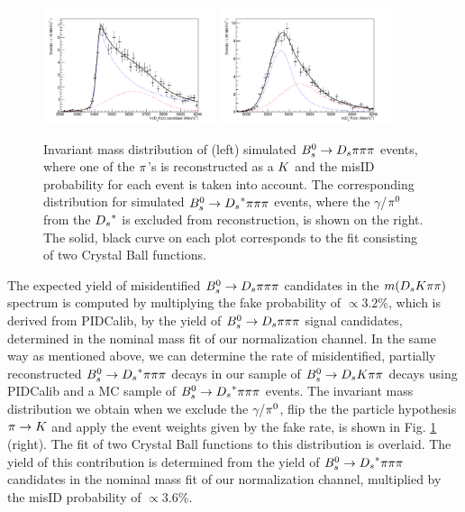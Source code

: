 \begin{figure}[h]
\includegraphics[height=6.cm,width=0.45\textwidth]{figs/Bs2Dspipipi_as_DsKpipi.pdf}
\includegraphics[height=6.cm,width=0.45\textwidth]{figs/Bs2Dsstarpipipi_as_DsKpipi.pdf}
\caption{Invariant mass distribution of (left) simulated ${{B}^0_{s}}\rightarrow{\ensuremath{{D}_{s}}}{\ensuremath{\pi}}{\ensuremath{\pi}}{\ensuremath{\pi}}$ events, where one of the ${\pi}$'s is reconstructed as a ${K}$ and the misID probability for each event is taken into account. 
The corresponding distribution for simulated ${{B}^0_{s}}\rightarrow{\ensuremath{{D}_{s}}}^{*}{\pi}{\pi}{\pi}$ events, where the $\gamma$/${{\pi}^0}$ from the ${{D}_{s}}^{*}$ is excluded from reconstruction, is shown on the right.
The solid, black curve on each plot corresponds to the fit consisting of two Crystal Ball functions.}
\label{fig: BsDspipipiMCmissID}
\end{figure}
 
The expected yield of misidentified ${{B}^0_{s}}\rightarrow{\ensuremath{{D}_{s}}}{\ensuremath{\pi}}{\ensuremath{\pi}}{\ensuremath{\pi}}$ candidates in the $m({{D}_{s}}{K}{\pi}{\pi})$ spectrum is computed by multiplying the fake probability of $\propto3.2\%$, which is derived from PIDCalib, by the yield of ${{B}^0_{s}}\rightarrow{\ensuremath{{D}_{s}}}{\ensuremath{\pi}}{\ensuremath{\pi}}{\ensuremath{\pi}}$ signal candidates, determined in the nominal mass fit of our normalization channel.  \newline
In the same way as mentioned above, we can determine the rate of misidentified, partially reconstructed ${{B}^0_{s}}\rightarrow{\ensuremath{{D}_{s}}}^{*}{\pi}{\pi}{\pi}$ decays in our sample of ${{B}^0_{s}}\rightarrow{\ensuremath{{D}_{s}}}{\ensuremath{K}}{\ensuremath{\pi}}{\ensuremath{\pi}}$ decays using PIDCalib and a MC sample of ${{B}^0_{s}}\rightarrow{\ensuremath{{D}_{s}}}^{*}{\pi}{\pi}{\pi}$ events. The invariant mass distribution we obtain when we exclude the $\gamma$/${{\pi}^0}$, flip the the particle hypothesis ${\pi}\rightarrow{\ensuremath{K}}$ and apply the event weights given by the fake rate, is shown in Fig. \ref{fig: BsDspipipiMCmissID} (right). The fit of two Crystal Ball functions to this distribution is overlaid. 
The yield of this contribution is determined from the yield of ${{B}^0_{s}}\rightarrow{\ensuremath{{D}_{s}}}^{*}{\pi}{\pi}{\pi}$ candidates in the nominal mass fit of our normalization channel, multiplied by the misID probability of $\propto 3.6\%$.


